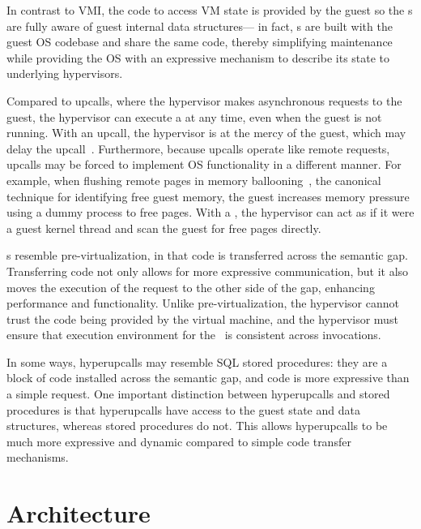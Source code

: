 \documentclass[11pt]{article}
\begin{document}
In contrast to VMI, the code to access VM state is provided by the guest 
so the \hypercallback{}s are fully aware of guest internal data structures---
in fact, \hypercallback{}s are built with the guest OS codebase and share the same code, 
thereby simplifying maintenance while providing the OS with an expressive mechanism to 
describe its state to underlying hypervisors. 

Compared to upcalls, where the hypervisor makes asynchronous requests to the guest, 
the hypervisor can execute a \hypercallback{} at any time, even when the guest is not running. 
With an upcall, the hypervisor is at the mercy of the guest, which may delay the upcall~\cite{arya2014tesseract}. 
Furthermore, because upcalls operate like remote requests, upcalls may be forced to implement OS functionality in 
a different manner. For example, when flushing remote pages in memory ballooning~\cite{waldspurger2002memory}, 
the canonical technique for identifying free guest memory,
the guest increases memory pressure using a dummy process to free pages. With a \hypercallback, 
the hypervisor can act as if it were a guest kernel thread and scan the guest for free pages directly.

\Hypercallback{}s resemble pre-virtualization, in that code is transferred across the semantic gap. Transferring code not only allows for more expressive communication, but it also moves the execution of the request to the other side of the gap, enhancing performance and functionality. Unlike pre-virtualization, the hypervisor cannot trust the code being provided by the virtual machine, and the hypervisor must ensure that execution environment for the \hypercallback~is consistent across invocations.

In some ways, hyperupcalls may resemble SQL stored procedures: they are a block of code installed across
the semantic gap, and code is more expressive than a simple request. One important distinction between
hyperupcalls and stored procedures is that hyperupcalls have access to the guest state and data structures,
whereas stored procedures do not. This allows hyperupcalls to be much more expressive and dynamic compared
to simple code transfer mechanisms.

    
\section{Architecture}
\label{sec:architecture}


\end{document}
